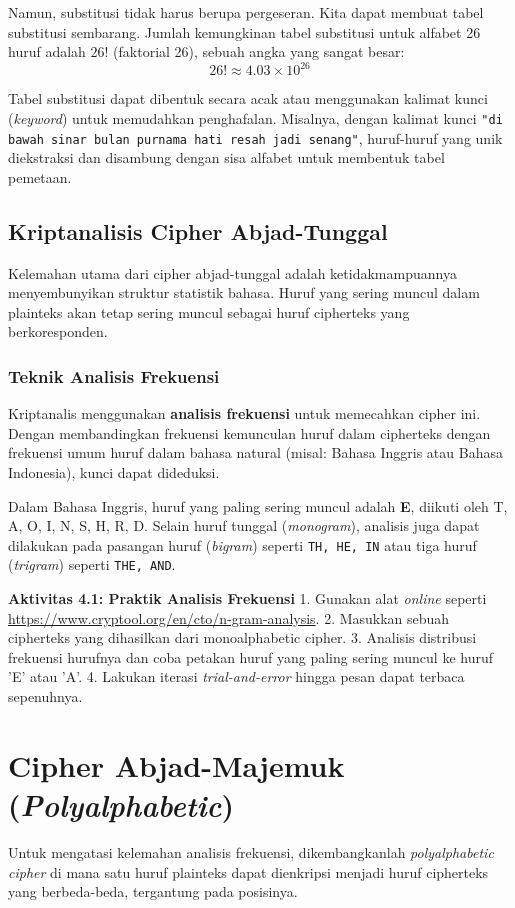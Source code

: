 \documentclass[../main.tex]{subfiles}
\begin{document}
Namun, substitusi tidak harus berupa pergeseran. Kita dapat membuat tabel substitusi sembarang. Jumlah kemungkinan tabel substitusi untuk alfabet 26 huruf adalah $26!$ (faktorial 26), sebuah angka yang sangat besar:
\[ 26! \approx 4.03 \times 10^{26} \]

Tabel substitusi dapat dibentuk secara acak atau menggunakan kalimat kunci (\textit{keyword}) untuk memudahkan penghafalan. Misalnya, dengan kalimat kunci \texttt{"di bawah sinar bulan purnama hati resah jadi senang"}, huruf-huruf yang unik diekstraksi dan disambung dengan sisa alfabet untuk membentuk tabel pemetaan.

\subsection{Kriptanalisis Cipher Abjad-Tunggal}
Kelemahan utama dari cipher abjad-tunggal adalah ketidakmampuannya menyembunyikan struktur statistik bahasa. Huruf yang sering muncul dalam plainteks akan tetap sering muncul sebagai huruf cipherteks yang berkoresponden.

\subsubsection{Teknik Analisis Frekuensi}
Kriptanalis menggunakan \textbf{analisis frekuensi} untuk memecahkan cipher ini. Dengan membandingkan frekuensi kemunculan huruf dalam cipherteks dengan frekuensi umum huruf dalam bahasa natural (misal: Bahasa Inggris atau Bahasa Indonesia), kunci dapat dideduksi.

Dalam Bahasa Inggris, huruf yang paling sering muncul adalah \textbf{E}, diikuti oleh T, A, O, I, N, S, H, R, D. Selain huruf tunggal (\textit{monogram}), analisis juga dapat dilakukan pada pasangan huruf (\textit{bigram}) seperti \texttt{TH, HE, IN} atau tiga huruf (\textit{trigram}) seperti \texttt{THE, AND}.

\begin{obeactivity}
\textbf{Aktivitas 4.1: Praktik Analisis Frekuensi}
1. Gunakan alat \textit{online} seperti \url{https://www.cryptool.org/en/cto/n-gram-analysis}.
2. Masukkan sebuah cipherteks yang dihasilkan dari monoalphabetic cipher.
3. Analisis distribusi frekuensi hurufnya dan coba petakan huruf yang paling sering muncul ke huruf 'E' atau 'A'.
4. Lakukan iterasi \textit{trial-and-error} hingga pesan dapat terbaca sepenuhnya.
\end{obeactivity}

\section{Cipher Abjad-Majemuk (\textit{Polyalphabetic})}
Untuk mengatasi kelemahan analisis frekuensi, dikembangkanlah \textit{polyalphabetic cipher} di mana satu huruf plainteks dapat dienkripsi menjadi huruf cipherteks yang berbeda-beda, tergantung pada posisinya.
\end{document}

